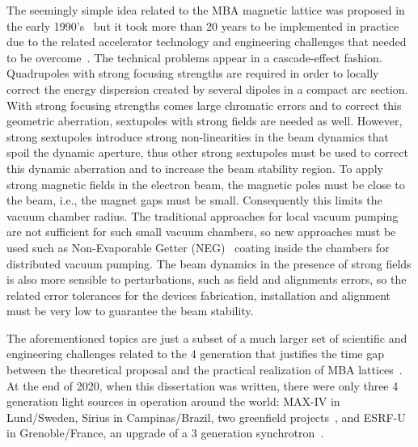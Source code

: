 The seemingly simple idea related to the MBA magnetic lattice was proposed in the early 1990's~\cite{einfeld1993} but it took more than 20 years to be implemented in practice due to the related accelerator technology and engineering challenges that needed to be overcome~\cite{hettel}. The technical problems appear in a cascade-effect fashion. Quadrupoles with strong focusing strengths are required in order to locally correct the energy dispersion created by several dipoles in a compact arc section. With strong focusing strengths comes large chromatic errors and to correct this geometric aberration, sextupoles with strong fields are needed as well. However, strong sextupoles introduce strong non-linearities in the beam dynamics that spoil the dynamic aperture, thus other strong sextupoles must be used to correct this dynamic aberration and to increase the beam stability region. To apply strong magnetic fields in the electron beam, the magnetic poles must be close to the beam, i.e., the magnet gaps must be small. Consequently this limits the vacuum chamber radius. The traditional approaches for local vacuum pumping are not sufficient for such small vacuum chambers, so new approaches must be used such as Non-Evaporable Getter (NEG)~\cite{benvenuti} coating inside the chambers for distributed vacuum pumping. The beam dynamics in the presence of strong fields is also more sensible to perturbations, such as field and alignments errors, so the related error tolerances for the devices fabrication, installation and alignment must be very low to guarantee the beam stability. 

The aforementioned topics are just a subset of a much larger set of scientific and engineering challenges related to the 4 generation that justifies the time gap between the theoretical proposal and the practical realization of MBA lattices~\cite{hettel, neuenschwander}. At the end of 2020, when this dissertation was written, there were only three 4 generation light sources in operation around the world: MAX-IV in Lund/Sweden, Sirius in Campinas/Brazil, two greenfield projects~\cite{tavaresmaxiv, liu2014}, and ESRF-U in Grenoble/France, an upgrade of a 3 generation synchrotron~\cite{raimondi}.
